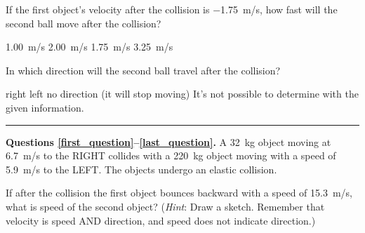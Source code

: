 \documentclass[]{exam}
\begin{document}
\begin{questions}
\begin{center}
\def\xa{1.5}
\def\xb{8.5}
\def\y{3}
\def\rb{6mm}
\end{center}

\question \label{SGv3JM}
If the first object's velocity after the collision is \SI{-1.75}{m/s}, how fast will the second ball move after the collision?

\begin{randomizechoices}
\choice \SI{1.00}{m/s}
\correctchoice \SI{2.00}{m/s} 
\choice \SI{1.75}{m/s}
\choice \SI{3.25}{m/s}
\end{randomizechoices}

\question \label{jlNXIi}
In which direction will the second ball travel after the collision?

\begin{randomizechoices}
\correctchoice right
\choice left
\choice no direction (it will stop moving)
\choice It's not possible to determine with the given information.
\end{randomizechoices}

\bigskip

\hrule

\begin{EnvUplevel}
\textbf{Questions \ref{first_question}--\ref{last_question}.} A \SI{32}{kg} object moving at \SI{6.7}{m/s} to the RIGHT collides with a \SI{220}{kg} object moving with a speed of \SI{5.9}{m/s} to the LEFT. The objects undergo an elastic collision.
\end{EnvUplevel}

\question \label{first_question}
 If after the collision the first object bounces backward with a speed of \SI{15.3}{m/s}, what is speed of the second object? (\textit{Hint}: Draw a sketch. Remember that velocity is speed AND direction, and speed does not indicate direction.)


\end{questions}
\end{document}
